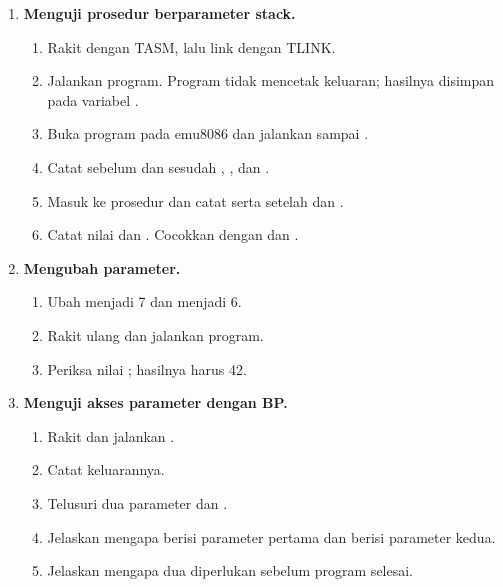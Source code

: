 \begin{enumerate}
    \item \textbf{Menguji prosedur berparameter stack.}
    \begin{enumerate}
        \item Rakit  dengan TASM, lalu link
              dengan TLINK.
        \item Jalankan program. Program tidak mencetak keluaran;
              hasilnya disimpan pada variabel .
        \item Buka program pada emu8086 dan jalankan
               sampai .
        \item Catat  sebelum dan sesudah ,
              , dan .
        \item Masuk ke prosedur dan catat  serta 
              setelah  dan .
        \item Catat nilai \code{[BP+4]} dan \code{[BP+6]}. Cocokkan
              dengan  dan .
    \end{enumerate}

    \item \textbf{Mengubah parameter.}
    \begin{enumerate}
        \item Ubah  menjadi 7 dan  menjadi 6.
        \item Rakit ulang dan jalankan program.
        \item Periksa nilai ; hasilnya harus 42.
    \end{enumerate}

    \item \textbf{Menguji akses parameter dengan BP.}
    \begin{enumerate}
        \item Rakit dan jalankan .
        \item Catat keluarannya.
        \item Telusuri  dua parameter dan .
        \item Jelaskan mengapa \code{[BP+0]} berisi parameter pertama
              dan \code{[BP+2]} berisi parameter kedua.
        \item Jelaskan mengapa dua  diperlukan sebelum
              program selesai.
    \end{enumerate}


\end{enumerate}
